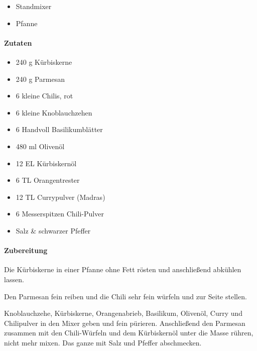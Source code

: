 \begin{itemize}[noitemsep]
	\item Standmixer
	\item Pfanne
\end{itemize}

\paragraph{Zutaten}

\begin{itemize}[noitemsep]
	\item 240 g Kürbiskerne
	\item 240 g Parmesan
	\item 6 kleine Chilis, rot
	\item 6 kleine Knoblauchzehen
	\item 6 Handvoll Basilikumblätter
	\item 480 ml Olivenöl
	\item 12 EL Kürbiskernöl
	\item 6 TL Orangentrester
	\item 12 TL Currypulver (Madras)
	\item 6 Messerspitzen Chili-Pulver
	\item Salz \& schwarzer Pfeffer
\end{itemize}

\paragraph{Zubereitung}

Die Kürbiskerne in einer Pfanne ohne Fett rösten und anschließend abkühlen 
lassen.

Den Parmesan fein reiben und die Chili sehr fein würfeln und zur Seite stellen.

Knoblauchzehe, Kürbiskerne, Orangenabrieb, Basilikum, Olivenöl, Curry und 
Chilipulver in den Mixer geben und fein pürieren. Anschließend den Parmesan 
zusammen mit den Chili-Würfeln und dem Kürbiskernöl unter die Masse 
rühren, nicht mehr mixen. Das ganze mit Salz und Pfeffer abschmecken.